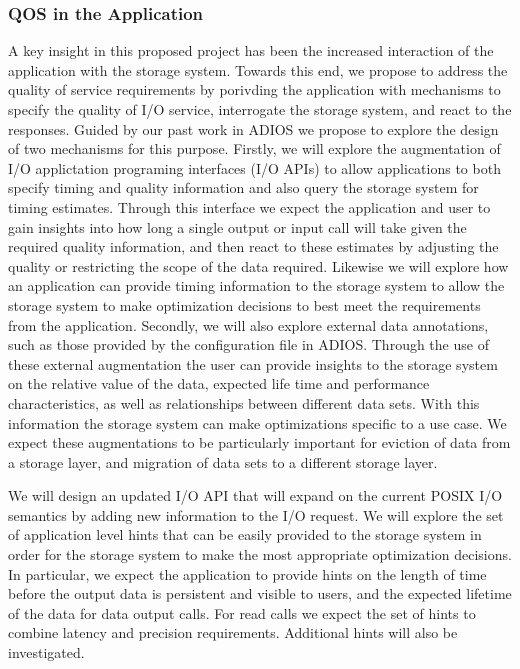 \subsubsection{QOS in the Application}
A key insight in this proposed project has been the increased interaction of
the application with the storage system. Towards this end, we propose to
address the quality of service requirements by porivding the application
with mechanisms to specify the quality of I/O service, interrogate the
storage system, and react to the responses. Guided by our past work in
ADIOS\cite{lofstead2008flexible} we propose to explore the design of two
mechanisms for this purpose. Firstly, we will explore the augmentation of
I/O applictation programing interfaces (I/O APIs) to allow applications to
both specify timing and quality information and also query the storage
system for timing estimates. Through this interface we expect the
application and user to gain insights into how long a single output or input
call will take given the required quality information, and then react to
these estimates by adjusting the quality or restricting the scope of the
data required. Likewise we will explore how an application can provide
timing information to the storage system to allow the storage system to make
optimization decisions to best meet the requirements from the application. 
%
Secondly, we will also explore external data annotations, such as those
provided by the configuration file in ADIOS. Through the use of these
external augmentation the user can provide insights to the storage system on
the relative value of the data, expected life time and performance
characteristics, as well as relationships between different data sets. With
this information the storage system can make optimizations specific to a use
case. We expect these augmentations to be particularly important for
eviction of data from a storage layer, and migration of data sets to a
different storage layer. 

We will design an updated I/O API that will expand on the current POSIX I/O
semantics by adding new information to the I/O request. We will explore the
set of application level hints that can be easily provided to the storage
system in order for the storage system to make the most appropriate
optimization decisions. In particular, we expect the application to provide
hints on the length of time before the output data is persistent and
visible to users, and the expected lifetime of the data for data output
calls. For read calls we expect the set of hints to combine latency and
precision requirements. Additional hints will also be investigated. 

